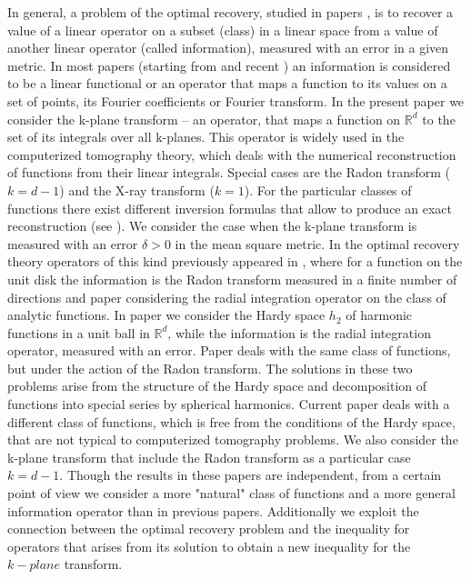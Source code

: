 \documentclass[12pt]{iopart}
\begin{document}
	In general, a problem of the optimal recovery, studied in papers \cite{SM,MR,MR1}, is to recover a value of a linear operator on a subset (class) in a linear space from a value of another linear operator (called information), measured with an error in a given metric. In most papers (starting from \cite{O} and recent \cite{OS,MO3}) an information is considered to be a linear functional or an operator that maps a function to its values on a set of points, its Fourier coefficients or Fourier transform. In the present paper we consider the k-plane transform -- an operator, that maps a function on $\mathbb R^d$ to the set of its integrals over all k-planes. This operator is widely used in the computerized tomography theory, which deals with the numerical reconstruction of functions from their linear integrals. Special cases are the Radon transform ($k=d-1$) and the X-ray transform ($k=1$). For the particular classes of functions there exist different inversion formulas that allow to produce an exact reconstruction (see \cite{Na}). We consider the case when the k-plane transform is measured with an error $\delta>0$ in the mean square metric. In the optimal recovery theory operators of this kind previously appeared in \cite{LS}, where for a function on the unit disk the information is the Radon transform measured in a finite number of directions and paper \cite{D} considering the radial integration operator on the class of analytic functions. In paper \cite{B} we consider the Hardy space $h_2$ of harmonic functions in a unit ball in $\mathbb R^d$, while the information is the radial integration operator, measured with an error. Paper \cite{B1} deals with the same class of functions, but under the action of the Radon transform. The solutions in these two problems arise from the structure of the Hardy space and decomposition of functions into special series by spherical harmonics. Current paper deals with a different class of functions, which is free from the conditions of the Hardy space, that are not typical to computerized tomography problems. We also consider the k-plane transform that include the Radon transform as a particular case $k=d-1$. Though the results in these papers are independent, from a certain point of view we consider a more "natural" class of functions and a more general information operator than in previous papers. Additionally we exploit the connection between the optimal recovery problem and the inequality for operators that arises from its solution to obtain a new inequality for the $k-plane$ transform.
	
\end{document}
